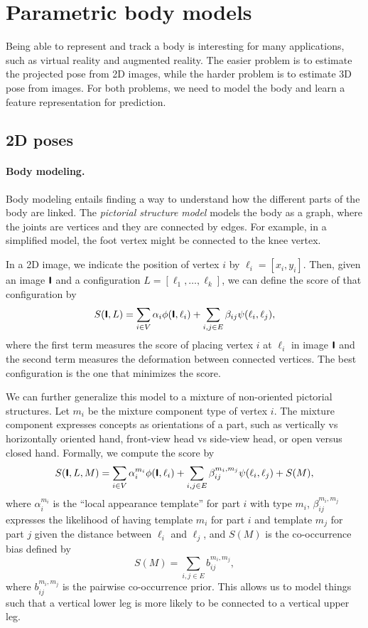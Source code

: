 \section{Parametric body models}

Being able to represent and track a body is interesting for many applications, such as virtual
reality and augmented reality. The easier problem is to estimate the projected pose from 2D images,
while the harder problem is to estimate 3D pose from images. For both problems, we need to model
the body and learn a feature representation for prediction.

\subsection{2D poses}

\paragraph{Body modeling.}

Body modeling entails finding a way to understand how the different parts of the body are linked.
The \textit{pictorial structure model} \citep{yang2011articulated} models the body as a graph,
where the joints are vertices and they are connected by edges. For example, in a simplified model,
the foot vertex might be connected to the knee vertex.

In a 2D image, we indicate the position of vertex $i$ by $\ell_i = [x_i, y_i]$. Then, given an
image $\bm{\mathsf{I}}$ and a configuration $L = [\ell_1, \ldots, \ell_k]$, we can define the score of
that configuration by \[
    S(\bm{\mathsf{I}}, L) = \sum_{i \in V} \alpha_i \phi(\bm{\mathsf{I}}, \ell_i) + \sum_{i,j \in E} \beta_{ij} \psi(\ell_i, \ell_j),
\]
where the first term measures the score of placing vertex $i$ at $\ell_i$ in image $\bm{\mathsf{I}}$ and
the second term measures the deformation between connected vertices. The best configuration is the
one that minimizes the score.

We can further generalize this model to a mixture of non-oriented pictorial structures. Let $m_i$
be the mixture component type of vertex $i$. The mixture component expresses concepts as
orientations of a part, such as vertically vs horizontally oriented hand, front-view head vs
side-view head, or open versus closed hand. Formally, we compute the score by \[
    S(\bm{\mathsf{I}}, L, M) = \sum_{i \in V} \alpha_i^{m_i} \phi(\bm{\mathsf{I}}, \ell_i) + \sum_{i,j \in E} \beta_{ij}^{m_i,m_j} \psi(\ell_i, \ell_j)+ S(M),
\]
where $\alpha_i^{m_i}$ is the ``local appearance template'' for part $i$ with type $m_i$,
$\beta_{ij}^{m_i,m_j}$ expresses the likelihood of having template $m_i$ for part $i$ and template
$m_j$ for part $j$ given the distance between $\ell_i$ and $\ell_j$, and $S(M)$ is the
co-occurrence bias defined by \[
    S(M) = \sum_{i,j\in E} b_{ij}^{m_i,m_j},
\]
where $b_{ij}^{m_i,m_j}$ is the pairwise co-occurrence prior. This allows us to model things such
that a vertical lower leg is more likely to be connected to a vertical upper leg.

